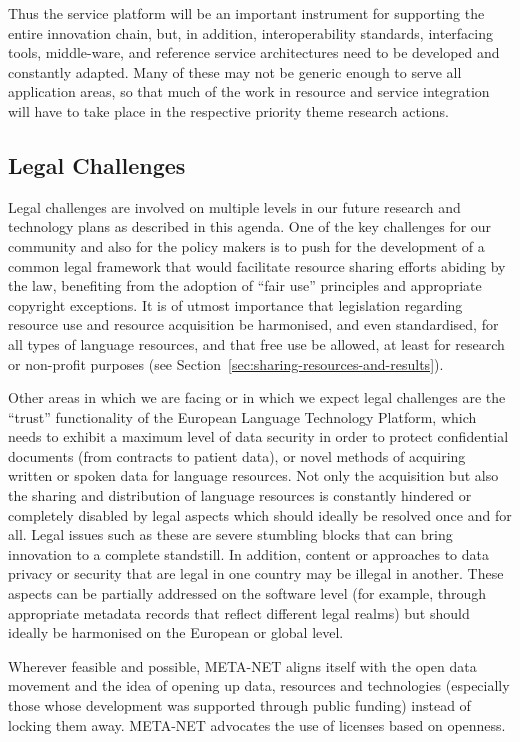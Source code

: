 \documentclass[10pt, plain]{../../metanetpaper}
\begin{document}
\begin{multicols}{2}
Thus the service platform will be an important instrument for supporting the entire innovation chain, but, in addition, interoperability standards, interfacing tools, middle-ware, and reference service architectures need to be developed and constantly adapted. Many of these may not be generic enough to serve all application areas, so that much of the work in resource and service integration will have to take place in the respective priority theme research actions.

\subsection{Legal Challenges}
\label{sec:legal-aspects}

Legal challenges are involved on multiple levels in our future research and technology plans as described in this agenda. One of the key challenges for our community and also for the policy makers is to push for the development of a common legal framework that would facilitate resource sharing efforts abiding by the law, benefiting from the adoption of “fair use” principles and appropriate copyright exceptions. It is of utmost importance that legislation regarding resource use and resource acquisition be harmonised, and even standardised, for all types of language resources, and that free use be allowed, at least for research or non-profit purposes (see Section~\ref{sec:sharing-resources-and-results}).

Other areas in which we are facing or in which we expect legal challenges are the ``trust'' functionality of the European Language Technology Platform, which needs to exhibit a maximum level of data security in order to protect confidential documents (from contracts to patient data), or novel methods of acquiring written or spoken data for language resources. Not only the acquisition but also the sharing and distribution of language resources is constantly hindered or completely disabled by legal aspects which should ideally be resolved once and for all. Legal issues such as these are severe stumbling blocks that can bring innovation to a complete standstill. In addition, content or approaches to data privacy or security that are legal in one country may be illegal in another. These aspects can be partially addressed on the software level (for example, through appropriate metadata records that reflect different legal realms) but should ideally be harmonised on the European or global level.

Wherever feasible and possible, META-NET aligns itself with the open data movement and the idea of opening up data, resources and technologies (especially those whose development was supported through public funding) instead of locking them away. META-NET advocates the use of licenses based on openness.


\end{multicols}
\end{document}
